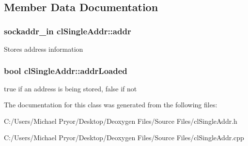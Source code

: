 \subsection{Member Data Documentation}
\hypertarget{classcl_single_addr_a335b724d7528d98f2e3a0677363adb4e}{
\subsubsection[{addr}]{\setlength{\rightskip}{0pt plus 5cm}sockaddr\_\-in {\bf clSingleAddr::addr}}}
\label{classcl_single_addr_a335b724d7528d98f2e3a0677363adb4e}
Stores address information \hypertarget{classcl_single_addr_a7362a831bef73c010bf729c2531e7b79}{
\subsubsection[{addrLoaded}]{\setlength{\rightskip}{0pt plus 5cm}bool {\bf clSingleAddr::addrLoaded}}}
\label{classcl_single_addr_a7362a831bef73c010bf729c2531e7b79}
true if an address is being stored, false if not 

The documentation for this class was generated from the following files:\begin{DoxyCompactItemize}
\item 
C:/Users/Michael Pryor/Desktop/Deoxygen Files/Source Files/clSingleAddr.h\item 
C:/Users/Michael Pryor/Desktop/Deoxygen Files/Source Files/clSingleAddr.cpp\end{DoxyCompactItemize}
